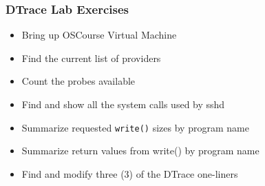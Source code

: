 \documentclass[pdftex,handout]{beamer}
\begin{document}
\begin{frame}[fragile]
  \frametitle{DTrace Lab Exercises}
  \begin{itemize}
  \item Bring up OSCourse Virtual Machine
  \item Find the current list of providers
  \item Count the probes available
  \item Find and show all the system calls used by sshd
  \item Summarize requested \verb|write()| sizes by program name
  \item Summarize return values from write() by program name
  \item Find and modify three (3) of the DTrace one-liners
  \end{itemize}
\end{frame}
\end{document}
